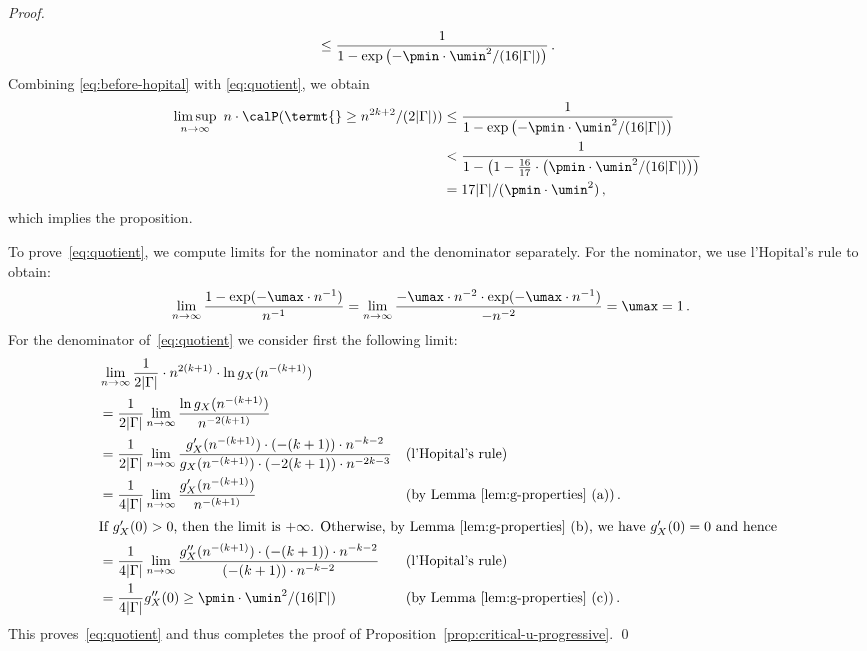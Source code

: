 \begin{proof}
\begin{equation}
\le \frac{1}{1 - \exp \left( - \pmin \cdot \umin^2 / (16 |\Gamma|) \right) }
  \,. \label{eq:quotient}
 \end{equation}
Combining \eqref{eq:before-hopital} with \eqref{eq:quotient}, we obtain
 \begin{align*}
  \limsup_{n \to \infty} \ n \cdot \calP(\termt{} \ge n^{2k+2}/(2 |\Gamma|))
   & \le \frac{1}{1 - \exp \left( - \pmin \cdot \umin^2 / (16 |\Gamma|) \right) } \\
   & < \frac{1}{1 - \left(1 - \frac{16}{17} \cdot \left( \pmin \cdot \umin^2 / (16 |\Gamma|) \right) \right) } \\
   & = 17 |\Gamma| / ( \pmin \cdot \umin^2 )
   \,,
 \end{align*}
which implies the proposition.

To prove~\eqref{eq:quotient}, we compute limits for the nominator and the denominator separately.
For the nominator, we use l'Hopital's rule to obtain:
 \begin{align*}
  \lim_{n\to\infty} \frac{1 - \exp(-\umax \cdot n^{-1})}{n^{-1}}
   & = \lim_{n\to\infty} \frac{-\umax \cdot n^{-2} \cdot \exp(-\umax \cdot n^{-1})}{-n^{-2}} = \umax = 1\,.
 \end{align*}
For the denominator of~\eqref{eq:quotient} we consider first the following limit:
 \begin{align*}
  & \lim_{n\to\infty} \frac1{2 |\Gamma|} \cdot n^{2(k+1)} \cdot \ln g_X(n^{-(k+1)}) \\
  & = \frac1{2 |\Gamma|} \lim_{n\to\infty} \frac{\ln g_X(n^{-(k+1)})}{n^{-2(k+1)}} \\
  & = \frac1{2 |\Gamma|} \lim_{n\to\infty} \frac{g_X'(n^{-(k+1)}) \cdot \left(-(k+1)\right) \cdot n^{-k-2}}{g_X(n^{-(k+1)}) \cdot \left( -2(k+1) \right) \cdot n^{-2k-3}}
       && \text{(l'Hopital's rule)} \\
  & = \frac1{4 |\Gamma|} \lim_{n\to\infty} \frac{g_X'(n^{-(k+1)})}{n^{-(k+1)}}
       && \text{(by Lemma~\ref{lem:g-properties}~(a))\,.} \\
\intertext{If $g_X'(0) > 0$, then the limit is $+\infty$. Otherwise, by Lemma~\ref{lem:g-properties}~(b), we have $g_X'(0) = 0$ and hence}
  & = \frac1{4 |\Gamma|} \lim_{n\to\infty} \frac{g_X''(n^{-(k+1)}) \cdot \left(-(k+1)\right) \cdot n^{-k-2}}{\left(-(k+1)\right) \cdot n^{-k-2}}
       && \text{(l'Hopital's rule)} \\
  & = \frac1{4 |\Gamma|} g_X''(0) \ge \pmin \cdot \umin^2 / (16 |\Gamma|)  && \text{(by Lemma~\ref{lem:g-properties}~(c))\,.}
 \end{align*}
This proves~\eqref{eq:quotient}
 and thus completes the proof of Proposition~\ref{prop:critical-u-progressive}.
\qed
\end{proof}

